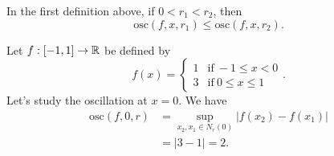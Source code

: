\begin{remark}
    In the first definition above, if \( 0 < {r}_{1} < {r}_{2} \), then 
    \[  \text{osc}(f,x,{r}_{1}) \leq \text{osc}(f,x,{r}_{2}). \]
\end{remark}

\begin{eg}
    Let \( f:[-1,1] \to \mathbb{R}  \) be defined by 
    \[  f(x) = 
    \begin{cases}
        1 &\text{if} \ -1 \leq x < 0 \\ 
        3 &\text{if} \ 0 \leq x \leq 1 
    \end{cases}. \]
    Let's study the oscillation at \( x = 0  \). We have 
    \begin{align*}
        \text{osc}(f,0,r) &=  \sup_{{x}_{2},{x}_{1} \in {N}_{r}(0) } | f({x}_{2}) - f({x}_{1}) | \\
                          &= |  3 - 1  |  = 2.
    \end{align*}
\end{eg}

